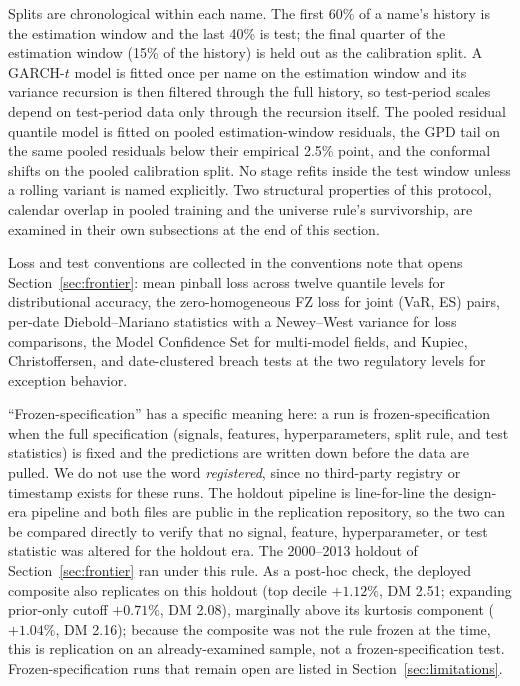 \documentclass[11pt]{article}
\theoremstyle{remark}
\begin{document}
Splits are chronological within each name. The first 60\% of a name's
history is the estimation window and the last 40\% is test; the final
quarter of the estimation window (15\% of the history) is held out as
the calibration split. A GARCH-$t$ model is fitted once per name on
the estimation window and its variance recursion is then filtered
through the full history, so test-period scales depend on test-period
data only through the recursion itself. The pooled residual quantile
model is fitted on pooled estimation-window residuals, the GPD tail on
the same pooled residuals below their empirical 2.5\% point, and the
conformal shifts on the pooled calibration split. No stage refits
inside the test window unless a rolling variant is named explicitly.
Two structural properties of this protocol, calendar overlap in
pooled training and the universe rule's survivorship, are examined in
their own subsections at the end of this section.

Loss and test conventions are collected in the conventions note that
opens Section~\ref{sec:frontier}: mean pinball loss across twelve
quantile levels for distributional accuracy, the zero-homogeneous FZ
loss \citep{fissler2016,patton2019} for joint (VaR, ES) pairs,
per-date Diebold--Mariano statistics with a Newey--West variance for
loss comparisons, the Model Confidence Set for multi-model fields, and
Kupiec, Christoffersen, and date-clustered breach tests at the two
regulatory levels for exception behavior.

``Frozen-specification'' has a specific meaning here: a run is
frozen-specification when the full specification (signals, features,
hyperparameters, split rule, and test statistics) is fixed and the
predictions are written down before the data are pulled. We do not use
the word \emph{registered}, since no third-party registry or timestamp
exists for these runs. The holdout pipeline is line-for-line the
design-era pipeline and both files are public in the replication
repository, so the two can be compared directly to verify that no signal,
feature, hyperparameter, or test statistic was altered for the holdout
era. The
2000--2013 holdout of Section~\ref{sec:frontier} ran under this rule. As
a post-hoc check, the deployed composite also replicates on this holdout
(top decile $+1.12\%$, DM 2.51; expanding prior-only cutoff $+0.71\%$,
DM 2.08), marginally above its kurtosis component ($+1.04\%$, DM 2.16);
because the composite was not the rule frozen at the time, this is
replication on an already-examined sample, not a frozen-specification
test.
Frozen-specification runs that remain open are listed in
Section~\ref{sec:limitations}.
\end{document}
